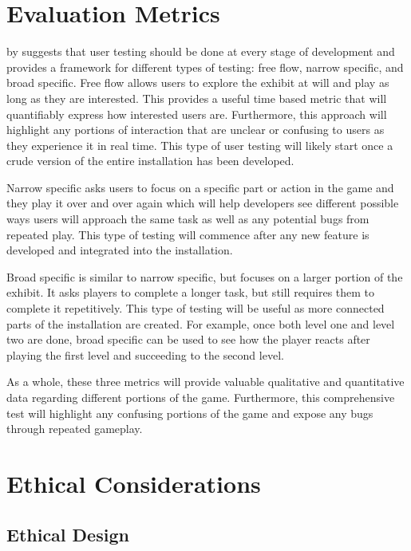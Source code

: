 \documentclass[10pt,twocolumn]{article}
\begin{document}
\section{Evaluation Metrics}
 by \citeauthor{bernhaupt_video_2010} suggests that user testing should be done at every stage of development and provides a framework for different types of testing: free flow, narrow specific, and broad specific. Free flow allows users to explore the exhibit at will and play as long as they are interested.  This provides a useful time based metric that will quantifiably express how interested users are.  Furthermore, this approach will highlight any portions of interaction that are unclear or confusing to users as they experience it in real time. This type of user testing will likely start once a crude version of the entire installation has been developed. 

Narrow specific asks users to focus on a specific part or action in the game and they play it over and over again which will help developers see different possible ways users will approach the same task as well as any potential bugs from repeated play. This type of testing will commence after any new feature is developed and integrated into the installation. 

Broad specific is similar to narrow specific, but focuses on a larger portion of the exhibit.  It asks players to complete a longer task, but still requires them to complete it repetitively. This type of testing will be useful as more connected parts of the installation are created. For example, once both level one and level two are done, broad specific can be used to see how the player reacts after playing the first level and succeeding to the second level. 

As a whole, these three metrics will provide valuable qualitative and quantitative data regarding different portions of the game. Furthermore, this comprehensive test will highlight any confusing portions of the game and expose any bugs through repeated gameplay. 

\section{Ethical Considerations}

\subsection{Ethical Design}\label{sec:design}
\end{document}
